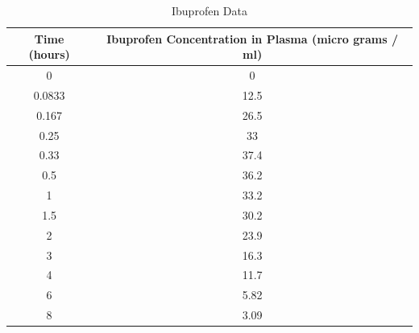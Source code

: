 \begin{table}[ht!]
    \centering
    \begin{tabular}{|c|c|}
        \hline
Time (hours)  &  Ibuprofen Concentration in Plasma (micro grams / ml) \\ \hline \hline
0  & 0 \\\hline
0.0833 &  12.5 \\\hline
0.167  & 26.5 \\\hline
0.25  & 33 \\\hline
0.33 &  37.4 \\\hline
0.5 &  36.2 \\\hline
1  & 33.2 \\\hline
1.5 &  30.2 \\\hline
2  & 23.9 \\\hline
3  & 16.3 \\\hline
4  & 11.7 \\\hline
6  & 5.82 \\\hline
8  & 3.09 \\\hline
    \end{tabular}
    \caption{Ibuprofen Data}
    \label{tab:ibuprofen_data}
\end{table}
